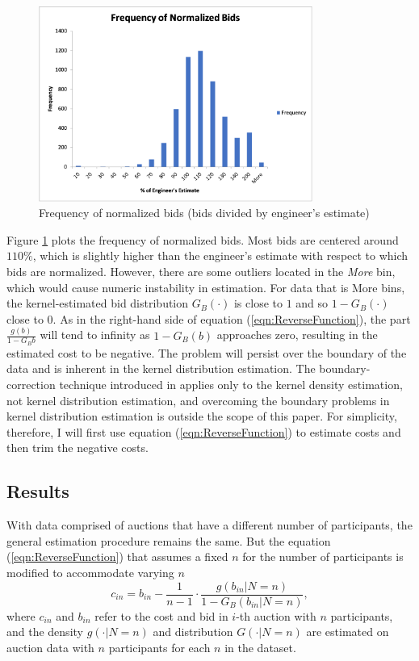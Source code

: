 \documentclass[11pt]{article}
\begin{document}
\begin{figure}[h]
    \includegraphics[width=0.8\textwidth]{BidFrequency.png}
    \centering
    \caption{Frequency of normalized bids (bids divided by engineer's estimate)}
    \label{fig:BidFrequency}
\end{figure}

Figure \ref{fig:BidFrequency} plots the frequency of normalized bids. Most bids 
are centered around $110\%$, which is slightly higher than the engineer's estimate 
with respect to which bids are normalized.
However, there are some outliers located in the \textit{More} bin, 
which would cause numeric instability in estimation. 
For data that is More bins, the kernel-estimated bid distribution 
$G_B(\cdot)$ is close to $1$ and so $1-G_B(\cdot)$ close to 0. As in 
the right-hand side of equation (\ref{eqn:ReverseFunction}), the 
part $\frac{g(b)}{1-G_B{b}}$ will tend to infinity as $1-G_B(b)$ 
approaches zero, resulting in the estimated cost to be negative. 
The problem will persist over the boundary of the data and is 
inherent in the kernel distribution estimation.
The boundary-correction technique introduced in \cite{HickmanHubbard2015}
applies only to the kernel density estimation, not kernel 
distribution estimation, and overcoming 
the boundary problems in kernel distribution estimation is outside the scope 
of this paper. For simplicity, therefore, I will first use equation 
(\ref{eqn:ReverseFunction}) to estimate costs and then trim the negative costs.

\subsection{Results}
With data comprised of auctions that have a different number of participants, 
the general estimation procedure remains the same. But the equation 
(\ref{eqn:ReverseFunction}) that assumes a fixed $n$ for the number 
of participants is modified to 
accommodate varying $n$ \cite{Matthewetal2018}
\begin{equation}
    c_{in} = b_{in} - \frac{1}{n-1} \cdot \frac{g(b_{in}|N = n)}{1-G_{B}(b_{in}|N=n)},
    \label{eqn:ReverseFunction_N}
\end{equation}
where $c_{in}$ and $b_{in}$ refer to the cost and bid in $i$-th auction 
with $n$ participants, and the density $g(\cdot|N=n)$ and distribution
$G(\cdot|N=n)$ are estimated on auction data with $n$ participants for 
each $n$ in the dataset. 
\end{document}
